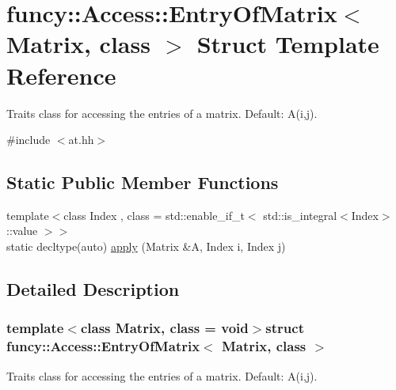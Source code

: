 \hypertarget{structfuncy_1_1Access_1_1EntryOfMatrix}{\section{funcy\-:\-:Access\-:\-:Entry\-Of\-Matrix$<$ Matrix, class $>$ Struct Template Reference}
\label{structfuncy_1_1Access_1_1EntryOfMatrix}
}


Traits class for accessing the entries of a matrix. Default\-: A(i,j).  




{\ttfamily \#include $<$at.\-hh$>$}

\subsection*{Static Public Member Functions}
\begin{DoxyCompactItemize}
\item 
{\footnotesize template$<$class Index , class  = std\-::enable\-\_\-if\-\_\-t$<$ std\-::is\-\_\-integral$<$\-Index$>$\-::value $>$$>$ }\\static decltype(auto) \hyperlink{structfuncy_1_1Access_1_1EntryOfMatrix_abb4493f9e90fe917035775384bc61920}{apply} (Matrix \&A, Index i, Index j)
\end{DoxyCompactItemize}


\subsection{Detailed Description}
\subsubsection*{template$<$class Matrix, class = void$>$struct funcy\-::\-Access\-::\-Entry\-Of\-Matrix$<$ Matrix, class $>$}

Traits class for accessing the entries of a matrix. Default\-: A(i,j). 

